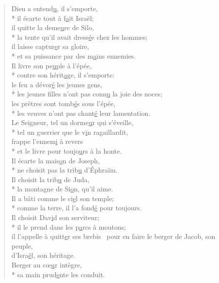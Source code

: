 \begin{verse}
Dieu a entend\underline{u}, il s’emporte, \\*
il écarte tout à f\underline{a}it Israël; \\
il quitte la deme\underline{u}re de Silo, \\*
la tente qu’il avait dress\underline{é}e chez les hommes; \\
il laisse captur\underline{e}r sa gloire, \\*
et sa puissance par des m\underline{a}ins ennemies. \\

Il livre son pe\underline{u}ple à l’épée, \\*
contre son hérit\underline{a}ge, il s’emporte: \\
le feu a dévor\underline{é} les jeunes gens, \\*
les jeunes filles n’ont pas conn\underline{u} la joie des noces; \\
les prêtres sont tomb\underline{é}s sous l’épée, \\*
les veuves n’ont pas chant\underline{é} leur lamentation. \\

Le Seigneur, tel un dorme\underline{u}r qui s’éveille, \\*
tel un guerrier que le v\underline{i}n ragaillardit, \\
frappe l’ennem\underline{i} à revers \\*
et le livre pour toujo\underline{u}rs à la honte. \\

Il écarte la mais\underline{o}n de Joseph, \\*
ne choisit pas la trib\underline{u} d’Éphraïm. \\
Il choisit la trib\underline{u} de Juda, \\*
la montagne de Si\underline{o}n, qu’il aime. \\
Il a bâti comme le ci\underline{e}l son temple; \\*
comme la terre, il l’a fond\underline{é} pour toujours. \\

Il choisit Dav\underline{i}d son serviteur; \\*
il le prend dans les p\underline{a}rcs à moutons; \\
il l’appelle à quitt\underline{e}r ses brebis~\psalmstar
pour en faire le berger de Jacob, son peuple, \\
d’Isra\underline{ë}l, son héritage. \\

Berger au cœ\underline{u}r intègre, \\*
sa main prud\underline{e}nte les conduit. \\
\end{verse}

